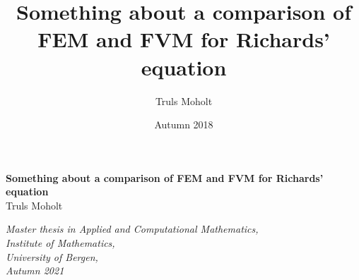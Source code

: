 \documentclass[12pt,oneside]{book}
\author{Truls Moholt}
\title{\vspace{-3.0cm}Something about a comparison of FEM and FVM for Richards' equation}
\date{Autumn 2018}
\numberwithin{equation}{chapter}
\theoremstyle{plain}
\begin{document}
\titlepage
\begin{center}
{\bf \LARGE Something about a comparison of FEM and FVM for Richards' equation}\\
\vspace{10\in}
\vspace{150\in}
{\large Truls Moholt\\ \vspace{30\in}}

\vspace*{\fill}
\it{Master thesis in Applied and Computational Mathematics, \\Institute of Mathematics, \\University of Bergen, \\Autumn 2021}
\end{center}
\tableofcontents
\newpage
%













\end{document}
